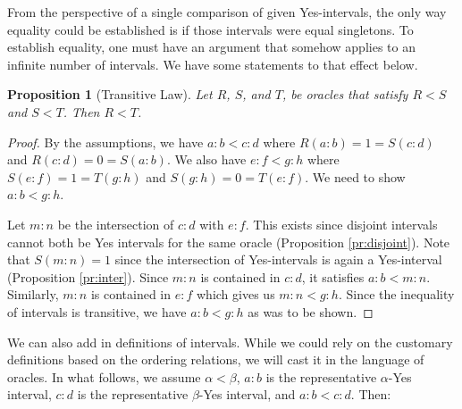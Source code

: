 \documentclass[12pt]{article}
\newtheorem{proposition}{Proposition}[subsection]
\theoremstyle{remark}
\begin{document}
From the perspective of a single comparison of given Yes-intervals, the only way equality could be established is if those intervals were equal singletons. To establish equality, one must have an argument that somehow applies to an infinite number of intervals. We have some statements to that effect below. 

\begin{proposition}[Transitive Law]\label{pr:transitive}
Let $R$, $S$, and $T$, be oracles that satisfy $R<S$ and $S < T$. Then $R < T$.
\end{proposition}

\begin{proof}
By the assumptions, we have $a:b < c:d$ where $R(a:b) = 1 = S(c:d)$ and $R(c:d) = 0 = S(a:b)$. We also have $e:f < g:h$ where $S(e:f) = 1 = T(g:h)$ and $S(g:h) = 0 = T(e:f)$. We need to show $a:b < g:h$.

Let $m:n$ be the intersection of $c:d$ with $e:f$. This exists since disjoint intervals cannot both be Yes intervals for the same oracle (Proposition \ref{pr:disjoint}). Note that $S(m:n) = 1$ since the intersection of Yes-intervals is again a Yes-interval (Proposition \ref{pr:inter}). Since $m:n$ is contained in $c:d$, it satisfies $a:b < m:n$. Similarly, $m:n$ is contained in $e:f$ which gives us $m:n < g:h$. Since the inequality of intervals is transitive, we have $a:b < g:h$ as was to be shown. 
\end{proof}

We can also add in definitions of intervals. While we could rely on the customary definitions based on the ordering relations, we will cast it in the language of oracles. In what follows, we assume $\alpha < \beta$, $a:b$ is the representative $\alpha$-Yes interval, $c:d$ is the representative $\beta$-Yes interval, and $a:b < c:d$. Then: 
\end{document}
